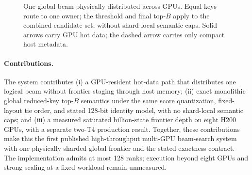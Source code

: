 \documentclass[10pt,twocolumn]{article}
\newcommand{\frontier}{\mathcal{F}}
\begin{document}
\begin{figure}[t]
\centering
{}
\caption{One global beam physically distributed across GPUs. Equal keys
route to one owner; the threshold and final top-$B$ apply to the combined
candidate set, without shard-local semantic caps. Solid arrows carry GPU
hot data; the dashed arrow carries only compact host metadata.}
\label{fig:global_beam}
\end{figure}

\paragraph{Contributions.}
The system contributes (i) a GPU-resident hot-data path that distributes one
logical beam without frontier staging through host memory; (ii) exact
monolithic global reduced-key top-$B$ semantics under the same score
quantization, fixed-layout tie order, and stated 128-bit identity model, with
no shard-local semantic caps; and (iii) a measured saturated billion-state
frontier depth on eight H200 GPUs, with a separate two-T4 production result.
Together, these contributions make this the first published
high-throughput multi-GPU beam-search system with one physically sharded global
frontier and the stated exactness contract.  The implementation admits at most
128 ranks; execution beyond eight GPUs and strong scaling at a fixed workload
remain unmeasured.
\end{document}
